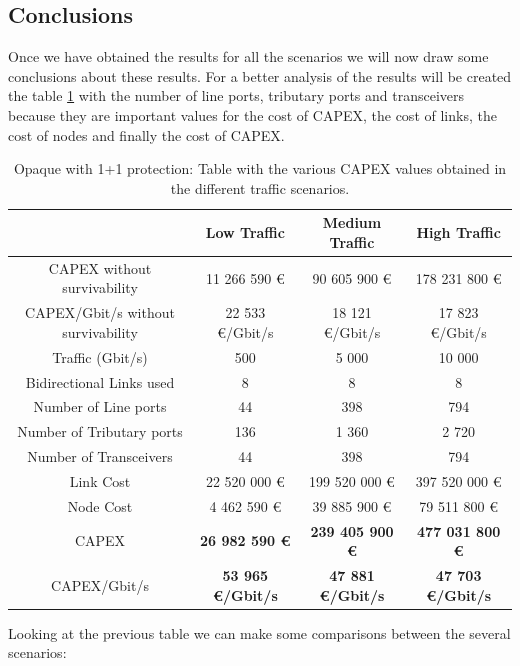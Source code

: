 \subsection{Conclusions}

Once we have obtained the results for all the scenarios we will now draw some conclusions about these results. For a better analysis of the results will be created the table \ref{table_comparative_opaque_protec} with the number of line ports, tributary ports and transceivers because they are important values for the cost of CAPEX, the cost of links, the cost of nodes and finally the cost of CAPEX.\\

\begin{table}[h!]
\centering
\begin{tabular}{| c | c | c | c |}
 \hline
  & Low Traffic & Medium Traffic  & High Traffic \\
 \hline\hline
 CAPEX without survivability&11 266 590 \euro&90 605 900 \euro&178 231 800 \euro\\ \hline
 CAPEX/Gbit/s without survivability&22 533 \euro/Gbit/s&18 121 \euro/Gbit/s&17 823 \euro/Gbit/s\\ \hline
 Traffic (Gbit/s) & 500 & 5 000 & 10 000 \\ \hline
 Bidirectional Links used & 8 & 8 & 8 \\ \hline
 Number of Line ports & 44 & 398 & 794 \\ \hline
 Number of Tributary ports & 136 & 1 360 & 2 720 \\ \hline
 Number of Transceivers & 44 & 398 & 794 \\ \hline
 Link Cost & 22 520 000 \euro & 199 520 000 \euro & 397 520 000 \euro \\ \hline
 Node Cost & 4 462 590 \euro & 39 885 900 \euro & 79 511 800 \euro \\ \hline
 CAPEX & \textbf{26 982 590 \euro} & \textbf{239 405 900 \euro} & \textbf{477 031 800 \euro} \\ \hline
 CAPEX/Gbit/s & \textbf{53 965 \euro/Gbit/s} & \textbf{47 881 \euro/Gbit/s} & \textbf{47 703 \euro/Gbit/s}\\
 \hline
\end{tabular}
\caption{Opaque with 1+1 protection: Table with the various CAPEX values obtained in the different traffic scenarios.}
\label{table_comparative_opaque_protec}
\end{table}

Looking at the previous table we can make some comparisons between the several scenarios:

